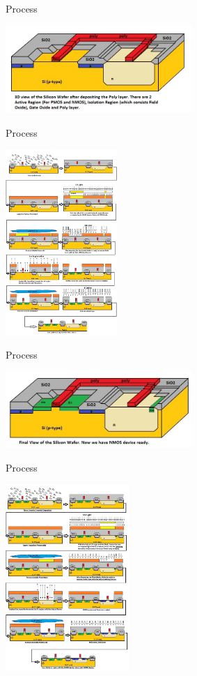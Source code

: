 \documentclass[9pt]{beamer}
\begin{document}
\begin{frame}{Process}
	\begin{center}
		\includegraphics[width=200pt]{end3.png}
	\end{center}
\end{frame}

\begin{frame}{Process}
	\begin{center}
		\includegraphics[height=200pt]{process4.png}
	\end{center}
\end{frame}

\begin{frame}{Process}
	\begin{center}
		\includegraphics[width=200pt]{end4.png}
	\end{center}
\end{frame}

\begin{frame}{Process}
	\begin{center}
		\includegraphics[height=200pt]{process5.png}
	\end{center}
\end{frame}
\end{document}
